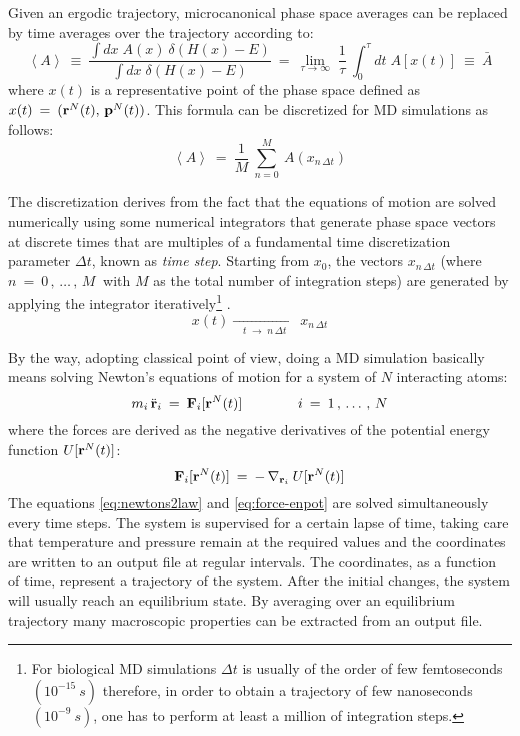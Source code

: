 Given an ergodic trajectory, microcanonical phase space averages can be replaced by time averages over the trajectory according to:
\begin{equation}\label{eq:stat_mean_val}
\left< A \right> \:\equiv\: 
\frac{\int dx \; A(x) \: \delta(H (x) - E)}{\int dx \; \delta(H (x) - E)} \:=\: 
\lim_{\tau \rightarrow \infty} \; \frac{1}{\tau} \: \int_0^\tau dt \; A[x(t)] \:\equiv\: \bar{A}
\end{equation}
where $x(t)$ is a representative point of the phase space defined as $x(t) \:=\: ( \bold{r}^N(t), \, \bold{p}^N(t) )$. 
This formula can be discretized for MD simulations as follows:
\begin{equation}\label{eq:stat_mean_val-discr}
\left< A \right> \:=\: \frac{1}{M} \: \sum_{n = 0}^M \: A(x_{n \, \Delta t})
\end{equation}

The discretization derives from the fact that the equations of motion are solved numerically using some numerical integrators that generate phase space vectors at discrete times that are multiples of a fundamental time discretization parameter $\Delta t$, known as \textit{time step}.
Starting from $x_0$, the vectors $x_{n \, \Delta t}$ (where $n \:=\: 0 \, , \, \dots \, , \, M\:$ with $M$ as the total number of integration steps) are generated by applying the integrator iteratively\footnote{For biological MD simulations $\Delta t$ is usually of the order of few femtoseconds $(10^{-15} \: s)$ therefore, in order to obtain a trajectory of few nanoseconds $(10^{-9} \: s)$, one has to perform at least a million of integration steps.} \cite{ref:mypresentation}.
\begin{equation}\label{eq:discretization}
x(t) \xrightarrow[\quad t \;\rightarrow\; n\,\Delta t \quad]{} x_{n \, \Delta t}
\end{equation}

By the way, adopting classical point of view, doing a MD simulation basically means solving Newton's equations of motion for a system of $N$ interacting atoms: 
\begin{equation}\label{eq:newtons2law}
m_i \, \ddot{\bold{r}}_i \: = \: \bold{F}_i [\bold{r}^N(t)]
\qquad\qquad i \:=\: 1 \, , \, \dots \, , \, N
\end{equation}
where the forces are derived as the negative derivatives of the potential energy function $U [\bold{r}^N(t)]$:
\begin{equation}\label{eq:force-enpot}
\bold{F}_i [\bold{r}^N(t)] \:=\: - \, \nabla_{\bold{r}_i} \: U [\bold{r}^N(t)] 
\end{equation}
The equations \eqref{eq:newtons2law} and \eqref{eq:force-enpot} are solved simultaneously every time steps. The system is supervised for a certain lapse of time, taking care that temperature and pressure remain at the required values and the coordinates are written to an output file at regular intervals. The coordinates, as a function of time, represent a trajectory of the system. After the initial changes, the system will usually reach an equilibrium state. By averaging over an equilibrium trajectory many macroscopic properties can be extracted from an output file.

